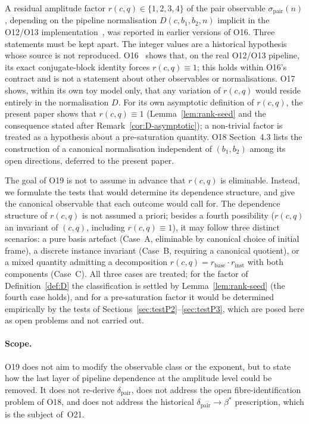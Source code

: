 \documentclass[11pt,a4paper]{article}
\theoremstyle{remark}
\newcommand{\bstar}{\beta^{*}}
\newcommand{\dpair}{\delta_{\mathrm{pair}}}
\newcommand{\sigmapair}{\sigma_{\mathrm{pair}}}
\newcommand{\rcq}{r(c,q)}
\begin{document}
  A residual amplitude factor $\rcq \in \{1, 2, 3, 4\}$ of the pair observable
  $\sigmapair(n)$, depending on the pipeline normalisation $D(c, b_{1}, b_{2}, n)$
  implicit in the O12/O13 implementation~\cite{Beau2026a16,Beau2026a17}, was reported in
  earlier versions of O16.
  Three statements must be kept apart.
  The integer values are a historical hypothesis whose source is not reproduced.
  O16~\cite{Beau2026a20} shows that, on the real O12/O13 pipeline, its exact conjugate-block
  identity forces $\rcq \equiv 1$; this holds within O16's contract and is not a statement
  about other observables or normalisations.
  O17~\cite{Beau2026a21} shows, within its own toy model only, that any variation of $\rcq$
  would reside entirely in the normalisation $D$.
  For its own asymptotic definition of $\rcq$, the present paper shows that $\rcq \equiv 1$
  (Lemma~\ref{lem:rank-seed} and the consequence stated after Remark~\ref{cor:D-asymptotic}); a
  non-trivial factor is treated as a hypothesis about a pre-saturation quantity.
  O18 Section~4.3 lists the construction of a canonical normalisation
  independent of $(b_{1}, b_{2})$ among its open directions, deferred
  to the present paper.

  The goal of O19 is not to assume in advance that $\rcq$ is eliminable.
  Instead, we formulate the tests that would determine its dependence structure, and give
  the canonical observable that each outcome would call for.
  The dependence structure of $\rcq$ is not assumed a priori; besides a fourth possibility
  ($\rcq$ an invariant of $(c,q)$, including $\rcq \equiv 1$), it may follow three distinct
  scenarios: a pure basis artefact (Case~A, eliminable by canonical choice of initial frame),
  a discrete instance invariant (Case~B, requiring a canonical quotient), or a mixed quantity
  admitting a decomposition $\rcq = r_{\mathrm{base}} \cdot r_{\mathrm{inst}}$ with both
  components (Case~C).
  All three cases are treated; for the factor of Definition~\ref{def:D} the classification is
  settled by Lemma~\ref{lem:rank-seed} (the fourth case holds), and for a pre-saturation factor it
  would be determined empirically by the tests of Sections~\ref{sec:testP2}--\ref{sec:testP3},
  which are posed here as open problems and not carried out.

  \paragraph{Scope.}
    O19 does not aim to modify the observable class or the exponent, but to state how the last
    layer of pipeline dependence at the amplitude level could be removed.
    It does not re-derive $\dpair$, does not address the open fibre-identification problem of O18, and does
    not address the historical $\dpair \to \bstar$ prescription, which is the subject of~O21.
\end{document}
